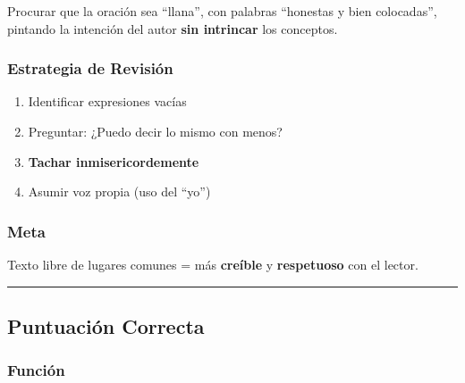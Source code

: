 \documentclass[
  11pt,
]{beaner}
\providecommand{\tightlist}{%
  \setlength{\itemsep}{0pt}\setlength{\parskip}{0pt}}
\begin{document}
\begin{tcolorbox}[enhanced jigsaw, arc=.35mm, rightrule=.15mm, breakable, titlerule=0mm, title=\textcolor{quarto-callout-tip-color}{\faLightbulb}\hspace{0.5em}{Cervantes sobre el Buen Español}, toprule=.15mm, left=2mm, colback=white, colbacktitle=quarto-callout-tip-color!10!white, bottomrule=.15mm, colframe=quarto-callout-tip-color-frame, toptitle=1mm, opacityback=0, opacitybacktitle=0.6, coltitle=black, bottomtitle=1mm, leftrule=.75mm]

Procurar que la oración sea ``llana'', con palabras ``honestas y bien
colocadas'', pintando la intención del autor \textbf{sin intrincar} los
conceptos.

\end{tcolorbox}

\subsubsection{Estrategia de Revisión}\label{estrategia-de-revisiuxf3n}

\begin{enumerate}
\def\labelenumi{\arabic{enumi}.}
\tightlist
\item
  Identificar expresiones vacías
\item
  Preguntar: ¿Puedo decir lo mismo con menos?
\item
  \textbf{Tachar inmisericordemente}
\item
  Asumir voz propia (uso del ``yo'')
\end{enumerate}

\subsubsection{Meta}\label{meta-2}

Texto libre de lugares comunes = más \textbf{creíble} y
\textbf{respetuoso} con el lector.

\begin{center}\rule{0.5\linewidth}{0.5pt}\end{center}

\subsection{Puntuación Correcta}\label{puntuaciuxf3n-correcta}

\subsubsection{Función}\label{funciuxf3n}
\end{document}

